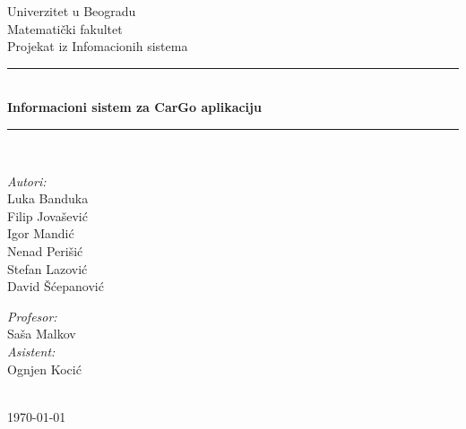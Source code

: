 \begin{titlepage}


\newcommand{\HRule}{\rule{\linewidth}{0.5mm}}
\center
\textup{\Large Univerzitet u Beogradu\\Matemati\v cki fakultet}\\[1.5cm]
\textup{\Large Projekat iz Infomacionih sistema}\\[0.4cm]

\HRule \\[0.4cm]
{ \huge \bfseries Informacioni sistem za CarGo aplikaciju}\\[0.4cm]
\HRule \\[8.5cm]

\begin{minipage}{0.4\textwidth}
\begin{flushleft}
\large
\emph{Autori:}\\
\textup Luka Banduka\\
\textup Filip Jovašević\\
\textup Igor Mandić\\
\textup Nenad Perišić\\
\textup Stefan Lazović\\
\textup David Šćepanović

\end{flushleft}
\end{minipage}
\hfill
\begin{minipage}{0.4\textwidth}
\begin{flushright}
\large
\emph{Profesor:} \\
\textup Saša Malkov\\
\emph{Asistent:} \\
\textup Ognjen Kocić\\
\end{flushright}
\end{minipage}\\[2cm]


{\textup \large \today}\\[1cm]

\end{titlepage}
